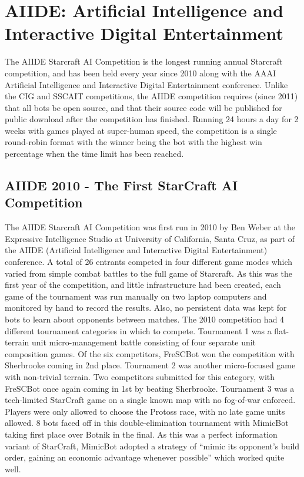 \section{AIIDE: Artificial Intelligence and Interactive Digital Entertainment}\label{subsecAIIDE}

The AIIDE Starcraft AI Competition is the longest running annual Starcraft competition, and has been held every year since 2010 along with the AAAI Artificial Intelligence and Interactive Digital Entertainment conference. Unlike the CIG and SSCAIT competitions, the AIIDE competition requires (since 2011) that all bots be open source, and that their source code will be published for public download after the competition has finished. Running 24 hours a day for 2 weeks with games played at super-human speed, the competition is a single round-robin format with the winner being the bot with the highest win percentage when the time limit has been reached. 

\subsection{AIIDE 2010 - The First StarCraft AI Competition}

The AIIDE Starcraft AI Competition was first run in 2010 by Ben Weber at the Expressive Intelligence Studio at University of California, Santa Cruz, as part of the AIIDE (Artificial Intelligence and Interactive Digital Entertainment) conference. A total of 26 entrants competed in four different game modes which varied from simple combat battles to the full game of Starcraft. As this was the first year of the competition, and little infrastructure had been created, each game of the tournament was run manually on two laptop computers and monitored by hand to record the results. Also, no persistent data was kept for bots to learn about opponents between matches. The 2010 competition had 4 different tournament categories in which to compete. Tournament 1 was a flat-terrain unit micro-management battle consisting of four separate unit composition games. Of the six competitors, FreSCBot won the competition with Sherbrooke coming in 2nd place. Tournament 2 was another micro-focused game with non-trivial terrain. Two competitors submitted for this category, with FreSCBot once again coming in 1st by beating Sherbrooke. Tournament 3 was a tech-limited StarCraft game on a single known map with no fog-of-war enforced. Players were only allowed to choose the Protoss race, with no late game units allowed. 8 bots faced off in this double-elimination tournament with MimicBot taking first place over Botnik in the final. As this was a perfect information variant of StarCraft, MimicBot adopted a strategy of ``mimic its opponent's build order, gaining an economic advantage whenever possible'' which worked quite well.

